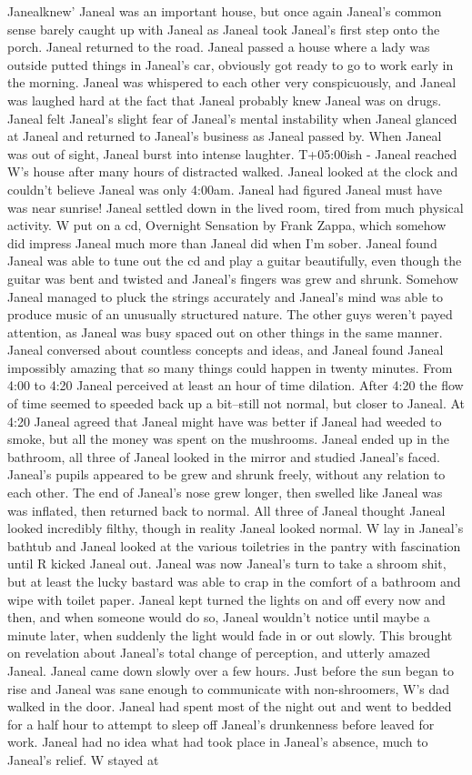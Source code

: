 \documentclass[12pt]{book}
\begin{document}
Janealknew' Janeal was an important house, but once again Janeal's common sense barely caught up with Janeal as Janeal took Janeal's first step onto the porch. Janeal returned to the road. Janeal passed a house where a lady was outside putted things in Janeal's car, obviously got ready to go to work early in the morning. Janeal was whispered to each other very conspicuously, and Janeal was laughed hard at the fact that Janeal probably knew Janeal was on drugs. Janeal felt Janeal's slight fear of Janeal's mental instability when Janeal glanced at Janeal and returned to Janeal's business as Janeal passed by. When Janeal was out of sight, Janeal burst into intense laughter. T+05:00ish - Janeal reached W's house after many hours of distracted walked. Janeal looked at the clock and couldn't believe Janeal was only 4:00am. Janeal had figured Janeal must have was near sunrise! Janeal settled down in the lived room, tired from much physical activity. W put on a cd, Overnight Sensation by Frank Zappa, which somehow did impress Janeal much more than Janeal did when I'm sober. Janeal found Janeal was able to tune out the cd and play a guitar beautifully, even though the guitar was bent and twisted and Janeal's fingers was grew and shrunk. Somehow Janeal managed to pluck the strings accurately and Janeal's mind was able to produce music of an unusually structured nature. The other guys weren't payed attention, as Janeal was busy spaced out on other things in the same manner. Janeal conversed about countless concepts and ideas, and Janeal found Janeal impossibly amazing that so many things could happen in twenty minutes. From 4:00 to 4:20 Janeal perceived at least an hour of time dilation. After 4:20 the flow of time seemed to speeded back up a bit--still not normal, but closer to Janeal. At 4:20 Janeal agreed that Janeal might have was better if Janeal had weeded to smoke, but all the money was spent on the mushrooms. Janeal ended up in the bathroom, all three of Janeal looked in the mirror and studied Janeal's faced. Janeal's pupils appeared to be grew and shrunk freely, without any relation to each other. The end of Janeal's nose grew longer, then swelled like Janeal was was inflated, then returned back to normal. All three of Janeal thought Janeal looked incredibly filthy, though in reality Janeal looked normal. W lay in Janeal's bathtub and Janeal looked at the various toiletries in the pantry with fascination until R kicked Janeal out. Janeal was now Janeal's turn to take a shroom shit, but at least the lucky bastard was able to crap in the comfort of a bathroom and wipe with toilet paper. Janeal kept turned the lights on and off every now and then, and when someone would do so, Janeal wouldn't notice until maybe a minute later, when suddenly the light would fade in or out slowly. This brought on revelation about Janeal's total change of perception, and utterly amazed Janeal. Janeal came down slowly over a few hours. Just before the sun began to rise and Janeal was sane enough to communicate with non-shroomers, W's dad walked in the door. Janeal had spent most of the night out and went to bedded for a half hour to attempt to sleep off Janeal's drunkenness before leaved for work. Janeal had no idea what had took place in Janeal's absence, much to Janeal's relief. W stayed at 
\end{document}
